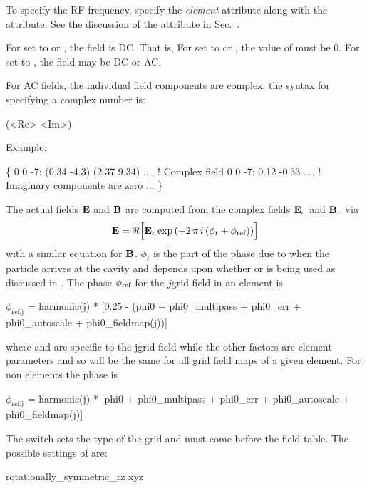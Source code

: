 To specify the RF frequency, specify the  {\em element} attribute along with
the  attribute. See the discussion of the  attribute in 
Sec.~.

For  set to  or , the field is DC. That is, For
 set to  or , the value of  must be
0. For  set to , the field may be DC or AC. 

For AC fields, the individual field components are complex.  the syntax for specifying a complex
number is:
\begin{example}
  (<Re> <Im>)
\end{example}
Example:
\begin{example}
  \{
    0 0 -7: (0.34 -4.3) (2.37 9.34) ...,    ! Complex field
    0 0 -7: 0.12 -0.33 ...,                 ! Imaginary components are zero
    ...
  \}
\end{example}

The actual fields ${\bf E}$ and ${\bf B}$ are computed from the complex fields ${\bf E}_c$ and ${\bf B}_c$ via
\begin{equation}
  {\bf E} = \Re \Bigl[ {\bf E}_c \exp \left( -2 \, \pi \, i \, (\phi_t + \phi_{\text{ref}}) \right) \Bigr]
\end{equation}
with a similar equation for ${\bf B}$. $\phi_t$ is the part of the phase due to when the particle
arrives at the cavity and depends upon whether  or  is being used as discussed in . The phase $\phi_{\text{ref}}$ for the
$j$\Th grid field in an  element is
\begin{example}
  \(\phi_\text{ref,j}\) = harmonic(j) * [0.25 - (phi0 + phi0_multipass + phi0_err + 
                                                  phi0_autoscale + phi0_fieldmap(j))] 
\end{example}
where  and  are specific to the j\Th grid field while the other
factors are element parameters and so will be the same for all grid field maps of a given
element. For non  elements the phase is
\begin{example}
  \(\phi_\text{ref,j}\) = harmonic(j) * [phi0 + phi0_multipass + phi0_err + 
                                                  phi0_autoscale + phi0_fieldmap(j)]
\end{example}

The  switch sets the type of the grid and must come before the field table. The
possible settings of  are:
\begin{example} 
  rotationally_symmetric_rz
  xyz
\end{example}

